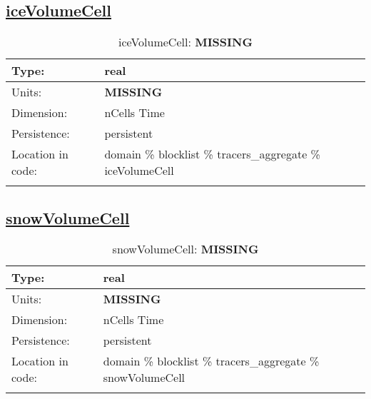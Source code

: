 \subsection[iceVolumeCell]{\hyperref[sec:var_tab_tracers_aggregate]{iceVolumeCell}}
\label{subsec:var_sec_tracers_aggregate_iceVolumeCell}
\begin{center}
\begin{longtable}{| p{2.0in} | p{4.0in} |}
        \hline 
        Type: & real \\
        \hline 
        Units: & {\bf \color{red} MISSING} \\
        \hline 
        Dimension: & nCells Time \\
        \hline 
        Persistence: & persistent \\
        \hline 
         Location in code: & domain \% blocklist \% tracers\_aggregate \% iceVolumeCell \\
         \hline 
    \caption{iceVolumeCell: {\bf \color{red} MISSING}}
\end{longtable}
\end{center}
\subsection[snowVolumeCell]{\hyperref[sec:var_tab_tracers_aggregate]{snowVolumeCell}}
\label{subsec:var_sec_tracers_aggregate_snowVolumeCell}
\begin{center}
\begin{longtable}{| p{2.0in} | p{4.0in} |}
        \hline 
        Type: & real \\
        \hline 
        Units: & {\bf \color{red} MISSING} \\
        \hline 
        Dimension: & nCells Time \\
        \hline 
        Persistence: & persistent \\
        \hline 
         Location in code: & domain \% blocklist \% tracers\_aggregate \% snowVolumeCell \\
         \hline 
    \caption{snowVolumeCell: {\bf \color{red} MISSING}}
\end{longtable}
\end{center}
